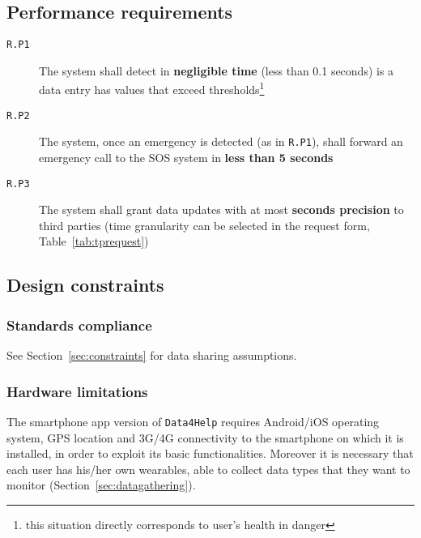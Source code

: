   \subsection{Performance requirements}
  \label{sec:performance}

    \begin{description}
      \item[\texttt{R.P1}] The system shall detect in \textbf{negligible time} (less than 0.1 seconds) is a data entry has values that exceed thresholds\footnote{this situation directly corresponds to user's health in danger}
      \item[\texttt{R.P2}] The system, once an emergency is detected (as in \texttt{R.P1}), shall forward an emergency call to the SOS system in \textbf{less than 5 seconds}
      \item[\texttt{R.P3}] The system shall grant data updates with at most \textbf{seconds precision} to third parties (time granularity can be selected in the request form, Table~\ref{tab:tprequest})
    \end{description}

  \subsection{Design constraints}

    \subsubsection{Standards compliance}

      See Section~\ref{sec:constraints} for data sharing assumptions.

    \subsubsection{Hardware limitations}

      The smartphone app version of \texttt{Data4Help} requires Android/iOS operating system, GPS location and 3G/4G connectivity to the smartphone on which it is installed, in order to exploit its basic functionalities. Moreover it is necessary that each user has his/her own wearables, able to collect data types that they want to monitor (Section~\ref{sec:datagathering}).


